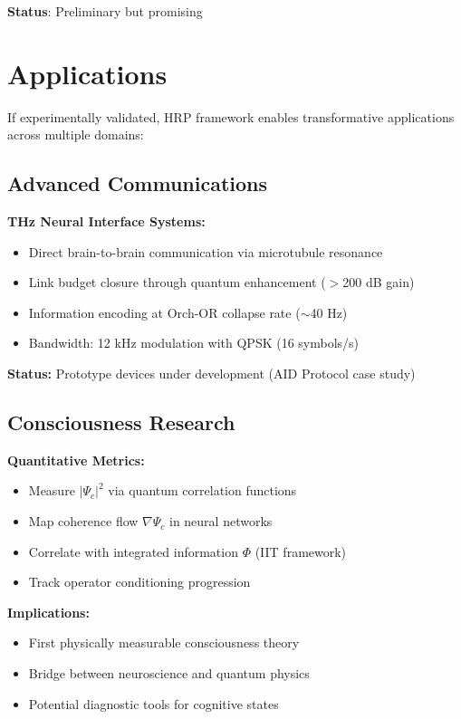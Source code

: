 \textbf{Status}: Preliminary but promising

\section{Applications}
\label{sec:applications}

If experimentally validated, HRP framework enables transformative applications across multiple domains:

\subsection{Advanced Communications}
\label{subsec:app-comms}

\textbf{THz Neural Interface Systems:}
\begin{itemize}
\item Direct brain-to-brain communication via microtubule resonance
\item Link budget closure through quantum enhancement ($>$200 dB gain)
\item Information encoding at Orch-OR collapse rate ($\sim$40 Hz)
\item Bandwidth: 12 kHz modulation with QPSK (16 symbols/s)
\end{itemize}

\textbf{Status:} Prototype devices under development (AID Protocol case study)

\subsection{Consciousness Research}
\label{subsec:app-consciousness}

\textbf{Quantitative Metrics:}
\begin{itemize}
\item Measure $|\Psi_c|^2$ via quantum correlation functions
\item Map coherence flow $\nabla\Psi_c$ in neural networks
\item Correlate with integrated information $\Phi$ (IIT framework)
\item Track operator conditioning progression
\end{itemize}

\textbf{Implications:}
\begin{itemize}
\item First physically measurable consciousness theory
\item Bridge between neuroscience and quantum physics
\item Potential diagnostic tools for cognitive states
\end{itemize}

